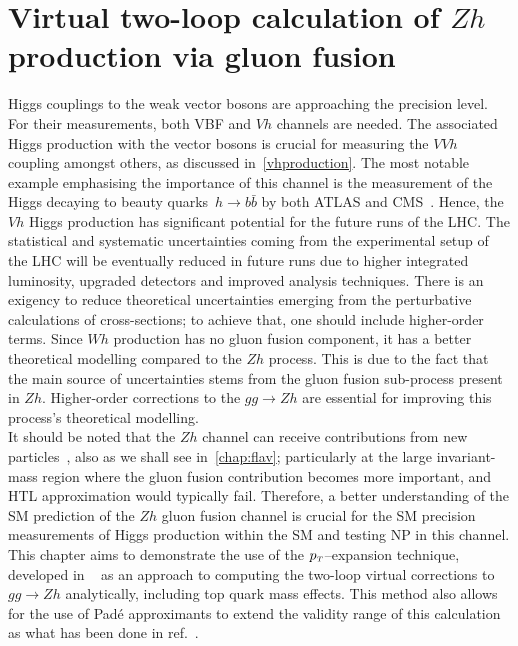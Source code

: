 \chapter{ Virtual two-loop calculation of  $Zh$ production via gluon fusion}\label{chap:hz}
\par  Higgs couplings to the weak vector bosons are approaching the precision level. For their measurements, both VBF and $Vh$ channels are needed. The associated Higgs production with the vector bosons is crucial for measuring the $VVh$ coupling amongst others, as discussed in~\autoref{vhproduction}. The most notable example emphasising the importance of this channel is the measurement of the Higgs decaying to beauty quarks~$h \rightarrow b \bar{b}$ by both ATLAS and CMS~\cite{Aaboud:2018zhk, Sirunyan:2018kst}. Hence, the~$Vh$ Higgs production has significant potential for the future runs of the LHC. The statistical and systematic uncertainties coming from the experimental setup of the LHC will be eventually reduced in future runs due to higher integrated luminosity,  upgraded detectors and improved analysis techniques. There is an exigency to reduce theoretical uncertainties emerging from the perturbative calculations of cross-sections; to achieve that, one should include higher-order terms. Since $Wh$ production has no gluon fusion component, it has a better theoretical modelling compared to the $Zh$ process. This is due to the fact that the main source of uncertainties stems from the gluon fusion sub-process present in $Zh$. Higher-order corrections to the $gg \to Zh$ are essential for improving this process's theoretical modelling. \\ 
It should be noted that the $Zh$ channel can receive contributions from new particles~\cite{Harlander:2013mla}, also as we shall see in~\autoref{chap:flav}; particularly at the large invariant-mass region where the gluon fusion contribution becomes more important, and HTL approximation would typically fail. Therefore, a better understanding of the SM prediction of the $Zh$ gluon fusion channel is crucial for the SM precision measurements of Higgs production within the SM and testing NP in this channel.  \\ This chapter aims to demonstrate the use of the $p_{\scriptscriptstyle T}$--expansion technique, developed in ~\cite{Bonciani:2018omm} as an approach to computing the two-loop virtual corrections to $gg \to Zh$ analytically, including top quark mass effects. This method also allows for the use of  Pad\'e approximants to extend the validity range of this calculation as what has been done in ref.~\cite{Bellafronte:2022jmo}.
